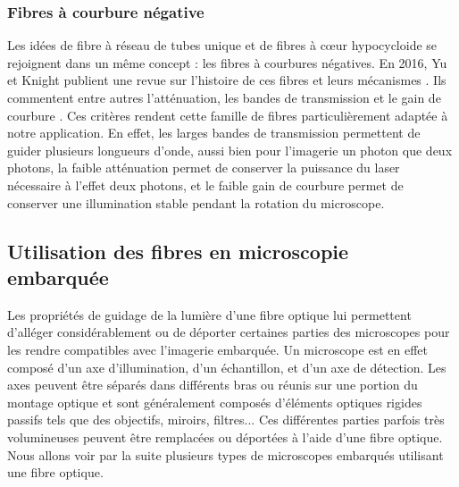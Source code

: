 \subsubsection{Fibres à courbure négative}

Les idées de fibre à réseau de tubes unique et de fibres à cœur hypocycloide se rejoignent dans un même concept : les fibres à courbures négatives. En 2016, Yu et Knight publient une revue sur l'histoire de ces fibres et leurs mécanismes \cite{yu_negative_2016}. Ils commentent entre autres l'atténuation, les bandes de transmission et le gain de courbure \cite{belardi_effect_2013}. Ces critères rendent cette famille de fibres particulièrement adaptée à notre application. En effet, les larges bandes de transmission permettent de guider plusieurs longueurs d'onde, aussi bien pour l'imagerie un photon que deux photons, la faible atténuation permet de conserver la puissance du laser nécessaire à l'effet deux photons, et le faible gain de courbure permet de conserver une illumination stable pendant la rotation du microscope.




\subsection{Utilisation des fibres en microscopie embarquée}


Les propriétés de guidage de la lumière d'une fibre optique lui permettent d'alléger considérablement ou de déporter certaines parties des microscopes pour les rendre compatibles avec l'imagerie embarquée. Un microscope est en effet composé d'un axe d'illumination, d'un échantillon, et d'un axe de détection. Les axes peuvent être séparés dans différents bras ou réunis sur une portion du montage optique et sont généralement composés d'éléments optiques rigides passifs tels que des objectifs, miroirs, filtres... Ces différentes parties parfois très volumineuses peuvent être remplacées ou déportées à l'aide d'une fibre optique. Nous allons voir par la suite plusieurs types de microscopes embarqués utilisant une fibre optique.

